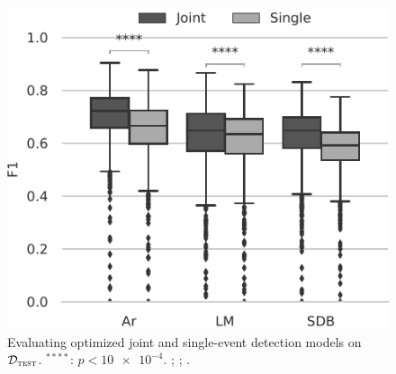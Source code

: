 \begin{figure}[tb]
    \centering
    \includegraphics[width=0.75\linewidth]{figures/paper-vi/f1_dist_boxplot.pdf}
    \caption[Optimized join and single-event model performance]{Evaluating optimized joint and single-event detection models on \(\mathcal{D}_\textsc{test}\). \(^{****}\): \(p < \num{10e-4}\). %
    ; %
    ; %
    .}
    \label{fig:f1_test}
\end{figure}

